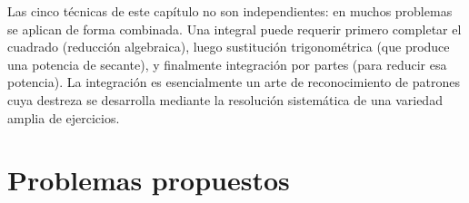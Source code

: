 \begin{rem}
Las cinco técnicas de este capítulo no son independientes: en muchos
problemas se aplican de forma combinada. Una integral puede requerir primero
completar el cuadrado (reducción algebraica), luego sustitución
trigonométrica (que produce una potencia de secante), y finalmente
integración por partes (para reducir esa potencia). La integración es
esencialmente un arte de reconocimiento de patrones cuya destreza se
desarrolla mediante la resolución sistemática de una variedad amplia de
ejercicios.
\end{rem}

\section{Problemas propuestos}


